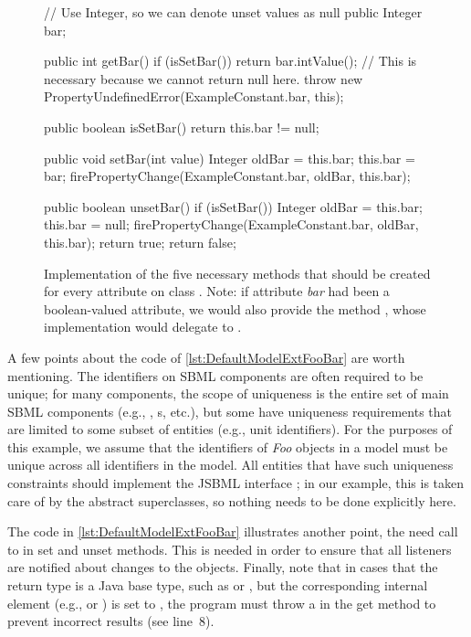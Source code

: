 \begin{figure}[hbt]
  \begin{example}[numbers=left]
// Use Integer, so we can denote unset values as null public Integer bar;

public int getBar() {
  if (isSetBar()) {
    return bar.intValue();
  }
  // This is necessary because we cannot return null here.
  throw new PropertyUndefinedError(ExampleConstant.bar, this);
}

public boolean isSetBar() {
  return this.bar != null;
}

public void setBar(int value) {
  Integer oldBar = this.bar;
  this.bar = bar;
  firePropertyChange(ExampleConstant.bar, oldBar, this.bar);
}

public boolean unsetBar() {
  if (isSetBar()) {
    Integer oldBar = this.bar;
    this.bar = null;
    firePropertyChange(ExampleConstant.bar, oldBar, this.bar);
    return true;
  }
  return false;
}\end{example}
  \caption{Implementation of the five necessary methods that should be
    created for every attribute on class .  Note: if attribute
    \emph{bar} had been a boolean-valued attribute, we would also provide
    the method , whose implementation would delegate to
    .}
  \label{lst:DefaultModelExtFooBar}
\end{figure}

A few points about the code of \vref{lst:DefaultModelExtFooBar} are worth
mentioning.  The identifiers on SBML components are often required to be
unique; for many components, the scope of uniqueness is the entire set of
main SBML components (e.g., \Species, \Compartment{}s, etc.), but some have
uniqueness requirements that are limited to some subset of entities (e.g.,
unit identifiers).  For the purposes of this example, we assume that the
identifiers of \emph{Foo} objects in a model must be unique across all
identifiers in the model.  All entities that have such uniqueness constraints
should implement the JSBML interface \UniqueNamedSBase; in our example, this
is taken care of by the abstract superclasses, so nothing needs to be done
explicitly here.

The code in \vref{lst:DefaultModelExtFooBar} illustrates
another point, the need call to  in set and
unset methods.  This is needed in order to ensure that all listeners are
notified about changes to the objects.  Finally, note that in cases that
the return type is a Java base type, such as  or ,
but the corresponding internal element (e.g.,  or
) is set to , the program must throw a
 in the get method to prevent incorrect
results (see line~8).

